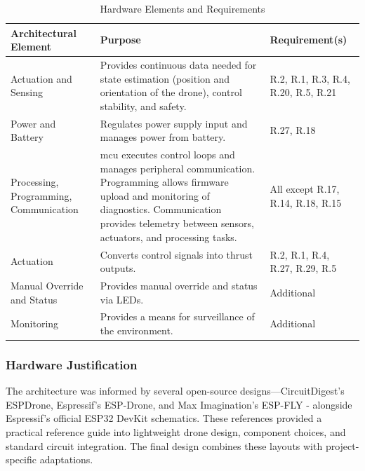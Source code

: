 \begin{table}[H]
\centering
\caption{Hardware Elements and Requirements}
\label{tab:hardware-arch}
\begin{tabular}{|m{}|m{}|m{}|}
\hline
\rowcolor{gray!15}
\textbf{Architectural Element} & \textbf{Purpose} & \textbf{Requirement(s)} \\
\hline
Actuation and Sensing & Provides continuous data needed for state estimation (position and orientation of the drone), control stability, and safety. & R.2, R.1, R.3, R.4, R.20, R.5, R.21 \\
\hline
Power and Battery  & Regulates power supply input and manages power from battery. & R.27, R.18 \\
\hline
Processing, Programming, Communication & \gls{mcu} executes control loops and manages peripheral communication.
Programming allows firmware upload and monitoring of diagnostics. Communication provides telemetry between sensors, actuators, and processing tasks. & All except R.17, R.14, R.18, R.15 \\
\hline
Actuation & Converts control signals into thrust outputs. & R.2, R.1, R.4, R.27, R.29, R.5 \\
\hline
Manual Override and Status & Provides manual override and status via LEDs. & Additional \\
\hline
Monitoring & Provides a means for surveillance of the environment. & Additional \\
\hline
\end{tabular}
\end{table}

\subsubsection{Hardware Justification}

The architecture was informed by several open-source designs—CircuitDigest’s ESPDrone, Espressif’s ESP-Drone, and Max Imagination’s ESP-FLY - alongside Espressif’s official ESP32 DevKit schematics. These references provided a practical reference guide into lightweight drone design, component choices, and standard circuit integration. The final design combines these layouts with project-specific adaptations. \temp{[Sources]}

